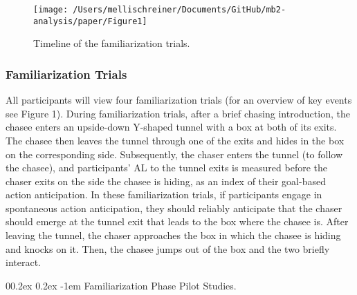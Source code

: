 \documentclass[
  man,floatsintext]{apa6}
\makeatletter
\let\oldparagraph\paragraph
\renewcommand{\paragraph}{
    \@ifstar
      \xxxParagraphStar
      \xxxParagraphNoStar
  }
\newcommand{\xxxParagraphStar}[1]{\oldparagraph*{#1}\mbox{}}
\newcommand{\xxxParagraphNoStar}[1]{\oldparagraph{#1}\mbox{}}
\renewcommand{\paragraph}{\@startsection{paragraph}{4}{\parindent}%
  {0\baselineskip \@plus 0.2ex \@minus 0.2ex}%
  {-1em}%
  {\normalfont\normalsize\bfseries\itshape\typesectitle}}
\makeatother
\begin{document}
\begin{figure}

{\centering \texttt{[image: /Users/mellischreiner/Documents/GitHub/mb2-analysis/paper/Figure1]} 

}

\caption{Timeline of the familiarization trials.}\label{fig:fig1}
\end{figure}

\subsubsection{Familiarization Trials}\label{familiarization-trials}

All participants will view four familiarization trials (for an overview of key events see Figure 1). During familiarization trials, after a brief chasing introduction, the chasee enters an upside-down Y-shaped tunnel with a box at both of its exits. The chasee then leaves the tunnel through one of the exits and hides in the box on the corresponding side. Subsequently, the chaser enters the tunnel (to follow the chasee), and participants' AL to the tunnel exits is measured before the chaser exits on the side the chasee is hiding, as an index of their goal-based action anticipation. In these familiarization trials, if participants engage in spontaneous action anticipation, they should reliably anticipate that the chaser should emerge at the tunnel exit that leads to the box where the chasee is. After leaving the tunnel, the chaser approaches the box in which the chasee is hiding and knocks on it. Then, the chasee jumps out of the box and the two briefly interact.

\paragraph{Familiarization Phase Pilot Studies.}\label{familiarization-phase-pilot-studies.}
\end{document}
